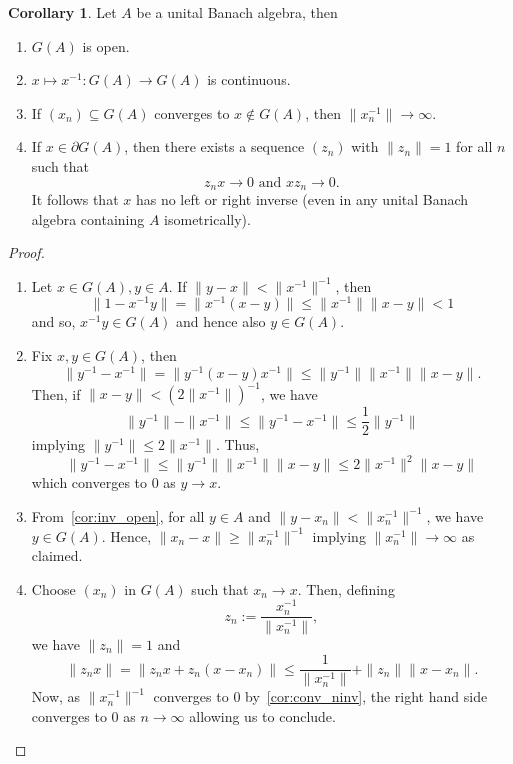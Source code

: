 \documentclass[]{article}
\theoremstyle{definition}
\newtheorem{corollary}{Corollary}[theorem]
\begin{document}
\begin{corollary}
  Let \(A\) be a unital Banach algebra, then 
  \begin{enumerate}
    \item\label{cor:inv_open} \(G(A)\) is open.
    \item \(x \mapsto x^{-1} : G(A) \to G(A)\) is continuous.
    \item\label{cor:conv_ninv} If \((x_n) \subseteq G(A)\) converges to \(x \not\in G(A)\), then \(\|x_n^{-1}\| \to \infty\).
    \item If \(x \in \partial G(A)\), then there exists a sequence \((z_n)\) with \(\|z_n\| = 1\) for all 
      \(n\) such that 
      \[z_n x \to 0 \text{ and } x z_n \to 0.\]
      It follows that \(x\) has no left or right inverse (even in any unital Banach algebra containing 
      \(A\) isometrically).
  \end{enumerate}
\end{corollary}
\begin{proof}\(\)\newline
  \begin{enumerate}
    \item Let \(x \in G(A), y \in A\). If \(\|y - x\| < \|x^{-1}\|^{-1}\), then 
    \[\|1 - x^{-1}y\| = \|x^{-1}(x - y)\| \le \|x^{-1}\| \|x - y\| < 1\]
    and so, \(x^{-1}y \in G(A)\) and hence also \(y \in G(A)\). 
    \item Fix \(x, y \in G(A)\), then
    \[\|y^{-1} - x^{-1}\| = \|y^{-1}(x - y)x^{-1}\| \le \|y^{-1}\|\|x^{-1}\|\|x - y\|.\]
    Then, if \(\|x - y\| < (2 \|x^{-1}\|)^{-1}\), we have 
    \[\|y^{-1}\| - \|x^{-1}\| \le \|y^{-1} - x^{-1}\| \le \frac{1}{2}\|y^{-1}\|\]
    implying \(\|y^{-1}\| \le 2\|x^{-1}\|\). Thus, 
    \[\|y^{-1} - x^{-1}\| \le \|y^{-1}\|\|x^{-1}\|\|x - y\| \le 2 \|x^{-1}\|^2 \|x - y\|\]
    which converges to 0 as \(y \to x\).
    \item From~\ref{cor:inv_open}, for all \(y \in A\) and \(\|y - x_n\| < \|x_n^{-1}\|^{-1}\), we have 
    \(y \in G(A)\). Hence, \(\|x_n - x\| \ge \|x_n^{-1}\|^{-1}\) implying \(\|x_n^{-1}\| \to \infty\)
    as claimed.
    \item Choose \((x_n)\) in \(G(A)\) such that \(x_n \to x\). Then, defining 
    \[z_n := \frac{x_n^{-1}}{\|x_n^{-1}\|},\]
    we have \(\|z_n\| = 1\) and 
    \[\|z_n x\| = \|z_n x + z_n(x - x_n)\| \le \frac{1}{\|x_n^{-1}\|} + \|z_n\| \|x - x_n\|.\]
    Now, as \(\|x_n^{-1}\|^{-1}\) converges to \(0\) by~\ref{cor:conv_ninv}, the right hand side 
    converges to 0 as \(n \to \infty\) allowing us to conclude.
  \end{enumerate}
\end{proof}
\end{document}
